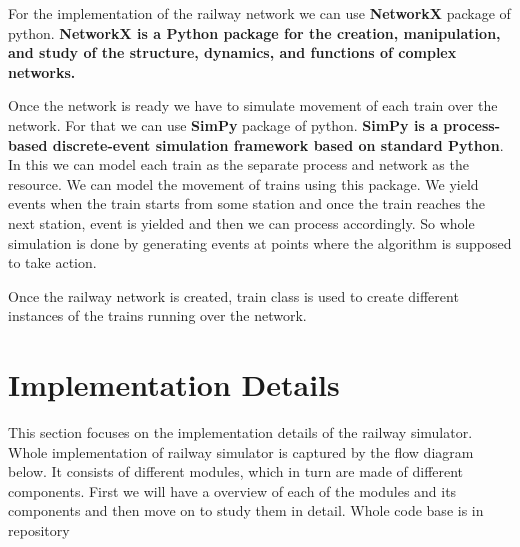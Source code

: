 For the implementation of the railway network we can use \textbf{NetworkX}\cite{WEBSITE:4} package of python.
\textbf{NetworkX is a Python package for the creation, manipulation,
and study of the structure, dynamics, and functions of complex networks.}
\vspace{1.5cm}

Once the network is ready we have to simulate movement of each train over the network. For 
that we can use \textbf{SimPy}\cite{WEBSITE:5} package of python. \textbf{SimPy is a process-based discrete-event simulation framework based on standard Python}.
In this we can model each train as the separate process and network as the resource. We can 
model the movement of trains using this package. We yield events when the train starts from some station and once 
the train reaches the next station, event is yielded and then we can process accordingly. So whole simulation is done 
by generating events at points where the algorithm is supposed to take action.

\vspace{\baselineskip}
Once the railway network is created, train class is used to create different instances
of the trains running over the network.

\section{Implementation Details}

This section focuses on the implementation details of the railway simulator. Whole
implementation of railway simulator is captured by the flow diagram below. It consists of 
different modules, which in turn are made of different components. First we will have a overview of
each of the modules and its components and then move on to study them in detail. Whole code base is in 
repository \cite{WEBSITE:6}

